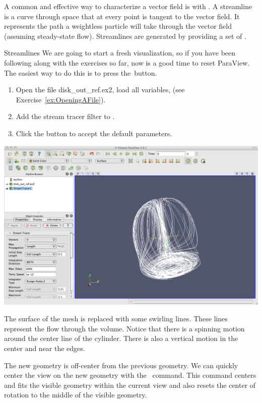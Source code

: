 A common and effective way to characterize a vector field is with
.  A streamline is a curve through space that at every
point is tangent to the vector field.  It represents the path a weightless
particle will take through the vector field (assuming steady-state flow).
Streamlines are generated by providing a set of
 .

\begin{exercise}{Streamlines}
  \label{ex:Streamlines}%
  We are going to start a fresh visualization, so if you have been
  following along with the exercises so far, now is a good time to reset
  ParaView.  The easiest way to do this is to press the~\disconnect button.

  \begin{enumerate}
  \item Open the file disk\_out\_ref.ex2, load all variables, \apply (see
    Exercise~\ref{ex:OpeningAFile}).
  \item Add the stream tracer filter \streamTracer to
    .
  \item Click the \apply button to accept the default parameters.
  \end{enumerate}

  \begin{inlinefig}
    \includegraphics[width=\scw]{images/StreamTracer0}
  \end{inlinefig}

  The surface of the mesh is replaced with some swirling lines.  These
  lines represent the flow through the volume.  Notice that there is a
  spinning motion around the center line of the cylinder.  There is also a
  vertical motion in the center and near the edges.

  The new geometry is off-center from the previous geometry.  We can
  quickly center the view on the new geometry with the ~\resetCamera command.  This command centers and fits the
  visible geometry within the current view and also resets the center of
  rotation to the middle of the visible geometry.
\end{exercise}

